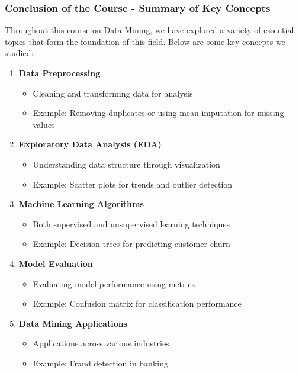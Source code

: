 \documentclass[aspectratio=169]{beamer}
\begin{document}
\begin{frame}[fragile]
    \frametitle{Conclusion of the Course - Summary of Key Concepts}
    Throughout this course on Data Mining, we have explored a variety of essential topics that form the foundation of this field. Below are some key concepts we studied:

    \begin{enumerate}
        \item \textbf{Data Preprocessing}
        \begin{itemize}
            \item Cleaning and transforming data for analysis
            \item Example: Removing duplicates or using mean imputation for missing values
        \end{itemize}
        
        \item \textbf{Exploratory Data Analysis (EDA)}
        \begin{itemize}
            \item Understanding data structure through visualization
            \item Example: Scatter plots for trends and outlier detection
        \end{itemize}

        \item \textbf{Machine Learning Algorithms}
        \begin{itemize}
            \item Both supervised and unsupervised learning techniques
            \item Example: Decision trees for predicting customer churn
        \end{itemize}

        \item \textbf{Model Evaluation}
        \begin{itemize}
            \item Evaluating model performance using metrics
            \item Example: Confusion matrix for classification performance
        \end{itemize}

        \item \textbf{Data Mining Applications}
        \begin{itemize}
            \item Applications across various industries
            \item Example: Fraud detection in banking
        \end{itemize}
    \end{enumerate}
\end{frame}
\end{document}
